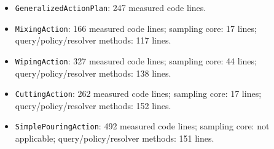 \begin{itemize}
  \item \texttt{GeneralizedActionPlan}: 247 measured code lines.
  \item \texttt{MixingAction}: 166 measured code lines; sampling core: 17 lines; query/policy/resolver methods: 117 lines.
  \item \texttt{WipingAction}: 327 measured code lines; sampling core: 44 lines; query/policy/resolver methods: 138 lines.
  \item \texttt{CuttingAction}: 262 measured code lines; sampling core: 17 lines; query/policy/resolver methods: 152 lines.
  \item \texttt{SimplePouringAction}: 492 measured code lines; sampling core: not applicable; query/policy/resolver methods: 151 lines.
\end{itemize}
